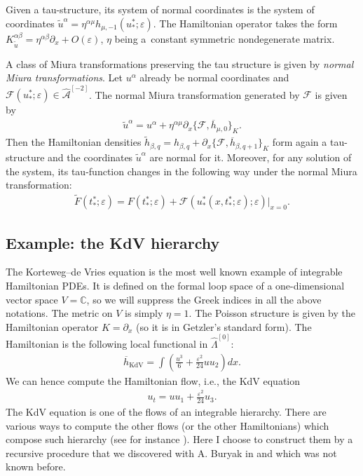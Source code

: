 \documentclass[pdftex]{sigma}
\numberwithin{equation}{section}
\newcommand{\mbC}{\mathbb C}
\newcommand{\oh}{\overline h}
\newcommand{\hLambda}{\widehat\Lambda}
\def\d{{\partial}}
\newcommand{\<}{\left<}
\renewcommand{\>}{\right>}
\newcommand{\eps}{\varepsilon}
\newcommand{\hcA}{\widehat{\mathcal A}}
\newcommand{\cF}{\mathcal F}
\begin{document}
Given a tau-structure, its system of normal coordinates is the system of coordinates $\widetilde{u}^\alpha=\eta^{\alpha\mu} h_{\mu,-1}(u^*_*;\eps)$. The Hamiltonian operator takes the form $K^{\alpha\beta}_{\widetilde{u}} = \eta^{\alpha \beta} \d_x +O(\eps)$, $\eta$ being a~constant symmetric nondegenerate matrix.

A class of Miura transformations preserving the tau structure is given by \emph{normal Miura transformations}. Let $u^\alpha$ already be normal coordinates and $\cF(u^*_*;\eps)\in \hcA^{[-2]}$. The normal Miura transformation generated by $\cF$ is given by
\begin{gather}\label{eq:normal Miura}
\widetilde{u}^\alpha = u^\alpha + \eta^{\alpha\mu} \d_x \big\{ \cF, \oh_{\mu,0} \big\}_K.
\end{gather}
Then the Hamiltonian densities $\widetilde{h}_{\beta,q} = h_{\beta,q} + \d_x \{\cF, \oh_{\beta,q+1}\}_K$ form again a tau-structure and the coordinates $\widetilde{u}^\alpha$ are normal for it. Moreover, for any solution of the system, its tau-function changes in the following way under the normal Miura transformation:
\begin{gather*}\widetilde{F}(t^*_*;\eps) = F(t^*_*;\eps)+ \cF(u^*_*(x,t^*_*;\eps);\eps)\big|_{x=0}.\end{gather*}

\subsection{Example: the KdV hierarchy}\label{section:KdV}
The Korteweg--de Vries equation is the most well known example of integrable Hamiltonian PDEs. It is def\/ined on the formal loop space of a one-dimensional vector space $V=\mbC$, so we will suppress the Greek indices in all the above notations. The metric on $V$ is simply $\eta=1$. The Poisson structure is given by the Hamiltonian operator $K = \d_x$ (so it is in Getzler's standard form). The Hamiltonian is the following local functional in $\hLambda^{[0]}$:
\begin{gather*}\oh_{\mathrm{KdV}} = \int \left(\frac{u^3}{6} + \frac{\eps^2}{24} u u_{2}\right) dx.\end{gather*}
We can hence compute the Hamiltonian f\/low, i.e., the KdV equation
\begin{gather*}u_t = u u_1 + \frac{\eps^2}{24} u_3.\end{gather*}
The KdV equation is one of the f\/lows of an integrable hierarchy. There are various ways to compute the other f\/lows (or the other Hamiltonians) which compose such hierarchy (see for instance \cite{Dic03}). Here I choose to construct them by a recursive procedure that we discovered with A. Buryak in \cite{BR14} and which was not known before.
\end{document}
